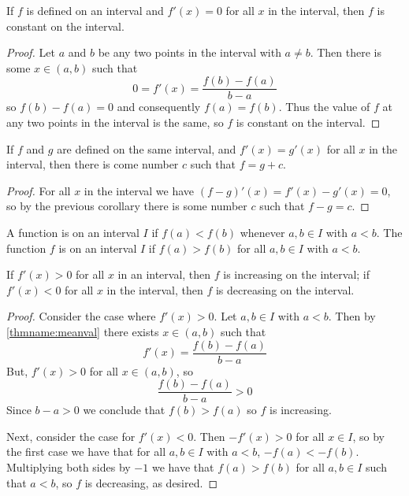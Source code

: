 \documentclass[12pt, a4paper, oneside, openright, titlepage]{book}
\begin{document}
\begin{cor}
    If $f$ is defined on an interval and $f'(x) = 0$ for all $x$ in the interval, then $f$ is constant on the interval.
\end{cor}
\begin{proof}
    Let $a$ and $b$ be any two points in the interval with $a \neq b$. Then there is some $x \in (a,b)$ such that \begin{equation*}
        0 = f'(x) = \frac{f(b) - f(a)}{b-a}
    \end{equation*}
    so $f(b) - f(a) = 0$ and consequently $f(a) = f(b)$. Thus the value of $f$ at any two points in the interval is the same, so $f$ is constant on the interval.
\end{proof}

\begin{cor}
    If $f$ and $g$ are defined on the same interval, and $f'(x) = g'(x)$ for all $x$ in the interval, then there is come number $c$ such that $f = g+c$.
\end{cor}
\begin{proof}
    For all $x$ in the interval we have $(f-g)'(x) = f'(x) - g'(x) = 0$, so by the previous corollary there is some number $c$ such that $f-g = c$.
\end{proof}


\begin{defn}
    A function is  on an interval $I$ if $f(a) < f(b)$ whenever $a,b \in I$ with $a < b$. The function $f$ is  on an interval $I$ if $f(a) > f(b)$ for all $a,b \in I$ with $a < b$.
\end{defn}


\begin{cor}
    If $f'(x) > 0$ for all $x$ in an interval, then $f$ is increasing on the interval; if $f'(x) < 0$ for all $x$ in the interval, then $f$ is decreasing on the interval.
\end{cor}
\begin{proof}
    Consider the case where $f'(x) > 0$. Let $a,b \in I$ with $a < b$. Then by \ref{thmname:meanval} there exists $x \in (a,b)$ such that \begin{equation*}
        f'(x) = \frac{f(b) - f(a)}{b-a}
    \end{equation*}
    But, $f'(x) > 0$ for all $x \in (a,b)$, so $$\frac{f(b) - f(a)}{b-a} > 0$$
    Since $b-a > 0$ we conclude that $f(b) > f(a)$ so $f$ is increasing.

    Next, consider the case for $f'(x) < 0$. Then $-f'(x) > 0$ for all $x \in I$, so by the first case we have that for all $a,b \in I$ with $a < b$, $-f(a) < -f(b)$. Multiplying both sides by $-1$ we have that $f(a) > f(b)$ for all $a,b \in I$ such that $a < b$, so $f$ is decreasing, as desired.
\end{proof}
\end{document}
